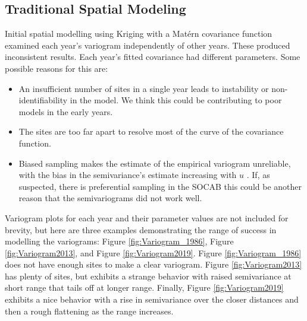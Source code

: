 \documentclass{article}
\begin{document}
\subsection{Traditional Spatial Modeling}
\label{subsec:tradspatmod}
Initial spatial modelling using Kriging with a Mat\'{e}rn covariance function examined each year's variogram independently of other years. These produced inconsistent results.  Each year's fitted covariance had different parameters.  Some possible reasons for this are:
\begin{itemize}
    \item An insufficient number of sites in a single year leads to instability or non-identifiability in the model.  We think this could be contributing to poor models in the early years.
    \item The sites are too far apart to resolve most of the curve of the covariance function. 
    \item Biased sampling makes the estimate of the empirical variogram unreliable, with the bias in the semivariance's estimate increasing with $u$ \citep{diggle:07}.  If, as suspected, there is preferential sampling in the \ac{SOCAB} this could be another reason that the semivariograms did not work well.
\end{itemize}

Variogram plots for each year and their parameter values are not 
included for brevity, 
but here are three examples demonstrating the range of success in modelling the variograms: Figure \ref{fig:Variogram_1986}, Figure \ref{fig:Variogram2013}, and Figure \ref{fig:Variogram2019}.  Figure  \ref{fig:Variogram_1986} does not have enough sites to make a clear variogram.  Figure  \ref{fig:Variogram2013} has plenty of sites, but exhibits a strange behavior with raised semivariance at short range that tails off at longer range.  Finally, Figure  \ref{fig:Variogram2019} exhibits a nice behavior with a rise in semivariance over the closer distances and then a rough flattening as the range increases.  
\end{document}
